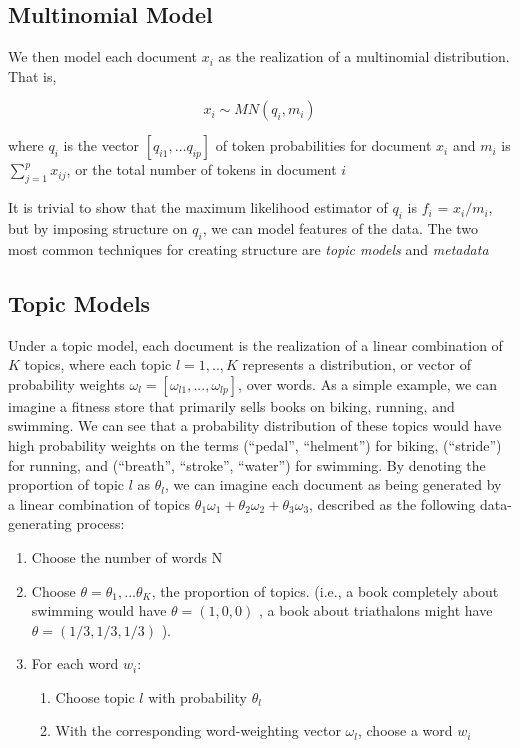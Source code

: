 \documentclass[12pt]{article}
\begin{document}
\subsection{Multinomial Model}\label{multinomial-model}

We then model each document $x_i$ as the realization of a multinomial
distribution. That is,

\[ x_{i} \sim MN(q_i,m_i) \]

where $q_i$ is the vector $[q_{i1}, \dots q_{ip}]$ of token
probabilities for document $x_i$ and $m_i$ is
$\sum_{j = 1}^{p}{x_{ij}}$, or the total number of tokens in document
$i$

It is trivial to show that the maximum likelihood estimator of $q_i$ is
$f_i$ = $x_i / m_i$, but by imposing structure on $q_i$, we can model
features of the data. The two most common techniques for creating
structure are \emph{topic models} and \emph{metadata}

\subsection{Topic Models}\label{topic-models}

Under a topic model, each document is the realization of a
linear combination of $K$ topics, where each topic $l = 1,..,K$ represents a
distribution, or vector of probability weights
$\omega_l = [\omega_{l1}, ... , \omega_{lp}]$, over words. As a simple
example, we can imagine a fitness store that primarily sells books on
biking, running, and swimming. We can see that a probability
distribution of these topics would have high probability weights on the
terms (``pedal'', ``helment'') for biking, (``stride'') for running, and
(``breath'', ``stroke'', ``water'') for swimming. By denoting the
proportion of topic $l$ as $\theta_l$, we can imagine each document as
being generated by a linear combination of topics
$\theta_1 \omega_1  + \theta_2 \omega_2 + \theta_3 \omega_3 $, described
as the following data-generating process:


\begin{enumerate}
\item 
Choose the number of words N 
\item
  Choose $\theta = \theta_1,...\theta_K$, the proportion of topics.
  (i.e., a book completely about swimming would have $\theta=(1,0,0)$ ,
  a book about triathalons might have $\theta =(1/3,1/3,1/3)$ ).
\item
  For each word $w_i$:
\begin{enumerate}
\item Choose topic $l$ with probability $\theta_l$
\item
With the corresponding word-weighting vector $\omega_l$, choose
  a word $w_{i}$
\end{enumerate}
\end{enumerate}
\end{document}
